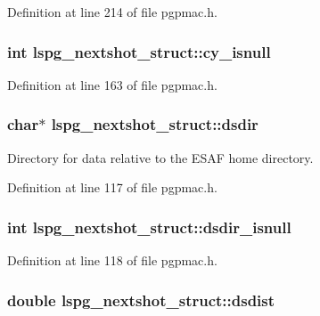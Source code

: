 Definition at line 214 of file pgpmac.h.\hypertarget{structlspg__nextshot__struct_a3895d645420848aed05b95694ec8c6c7}{
\subsubsection[{cy\_\-isnull}]{\setlength{\rightskip}{0pt plus 5cm}int {\bf lspg\_\-nextshot\_\-struct::cy\_\-isnull}}}
\label{structlspg__nextshot__struct_a3895d645420848aed05b95694ec8c6c7}


Definition at line 163 of file pgpmac.h.\hypertarget{structlspg__nextshot__struct_ac372e1774a25b3d4bfbb9169762eb39e}{
\subsubsection[{dsdir}]{\setlength{\rightskip}{0pt plus 5cm}char$\ast$ {\bf lspg\_\-nextshot\_\-struct::dsdir}}}
\label{structlspg__nextshot__struct_ac372e1774a25b3d4bfbb9169762eb39e}


Directory for data relative to the ESAF home directory. 

Definition at line 117 of file pgpmac.h.\hypertarget{structlspg__nextshot__struct_a8dea57b78b92d67d83ccbb6ed6da13ca}{
\subsubsection[{dsdir\_\-isnull}]{\setlength{\rightskip}{0pt plus 5cm}int {\bf lspg\_\-nextshot\_\-struct::dsdir\_\-isnull}}}
\label{structlspg__nextshot__struct_a8dea57b78b92d67d83ccbb6ed6da13ca}


Definition at line 118 of file pgpmac.h.\hypertarget{structlspg__nextshot__struct_acab9431a911f5bb11296cbfb271fb83a}{
\subsubsection[{dsdist}]{\setlength{\rightskip}{0pt plus 5cm}double {\bf lspg\_\-nextshot\_\-struct::dsdist}}}
\label{structlspg__nextshot__struct_acab9431a911f5bb11296cbfb271fb83a}



